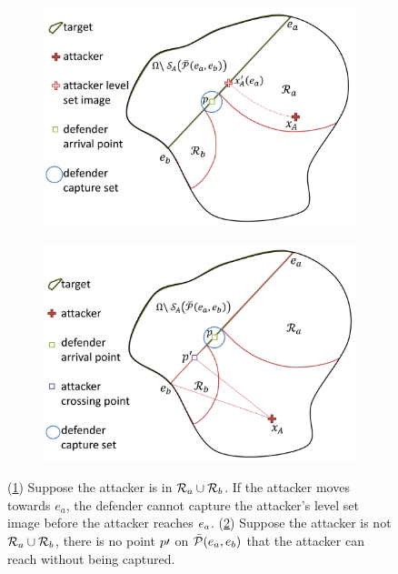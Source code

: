 \begin{figure}
\centering
	\begin{subfigure}{0.3\textwidth}
	\centering
	\includegraphics[width=\textwidth]{"fig/attacker in Ra"}
	\caption{\label{subfig:ainra}}
	\end{subfigure} \quad
	\begin{subfigure}{0.3\textwidth}
	\centering
	\includegraphics[width=\textwidth]{"fig/attacker outside Ra U Rb"}
	\caption{\label{subfig:aoutra}}
	\end{subfigure}
\caption{(\ref{subfig:ainra}) Suppose the attacker is in $\mathcal{R}_a\cup\mathcal{R}_b$. If the attacker moves towards $e_a$, the defender cannot capture the attacker's level set image before the attacker reaches $e_a$. (\ref{subfig:aoutra}) Suppose the attacker is not $\mathcal{R}_a\cup\mathcal{R}_b$, there is no point $p\prime$ on $\bar{\mathcal{P}}(e_a,e_b)$ that the attacker can reach without being captured.}
\label{fig:lemma1}
\end{figure}

